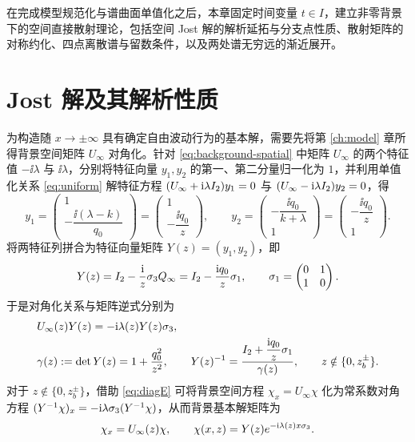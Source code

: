 
在完成模型规范化与谱曲面单值化之后，本章固定时间变量 $t\in I$，建立非零背景下的空间直接散射理论，包括空间 Jost 解的解析延拓与分支点性质、散射矩阵的对称约化、四点离散谱与留数条件，以及两处谱无穷远的渐近展开。

\section{Jost 解及其解析性质}

为构造随 $x\to\pm\infty$ 具有确定自由波动行为的基本解，需要先将第 \ref{ch:model} 章所得背景空间矩阵 $U_\infty$ 对角化。针对 \eqref{eq:background-spatial} 中矩阵 $U_\infty$ 的两个特征值 $-\ii\lambda$ 与 $\ii\lambda$，分别将特征向量 $y_1,y_2$ 的第一、第二分量归一化为 $1$，并利用单值化关系 \eqref{eq:uniform} 解特征方程 $(U_\infty+\mathrm{i}\lambda I_2)y_1=0$ 与 $(U_\infty-\mathrm{i}\lambda I_2)y_2=0$，得
\begin{equation*}
y_1=\begin{pmatrix}1\\[2pt]-\dfrac{\ii(\lambda-k)}{q_0}\end{pmatrix}
=\begin{pmatrix}1\\[2pt]-\dfrac{\ii q_0}{z}\end{pmatrix},\qquad
y_2=\begin{pmatrix}-\dfrac{\ii q_0}{k+\lambda}\\[2pt]1\end{pmatrix}
=\begin{pmatrix}-\dfrac{\ii q_0}{z}\\[2pt]1\end{pmatrix}.
\end{equation*}
将两特征列拼合为特征向量矩阵 $Y(z)=(y_1,y_2)$，即
\begin{equation}\label{eq:E}
Y(z)=I_2-\dfrac{\mathrm{i}}{z}\sigma_3 Q_\infty
=I_2-\dfrac{\mathrm{i} q_0}{z}\sigma_1,\qquad
\sigma_1=\begin{pmatrix}0&1\\1&0\end{pmatrix}.
\end{equation}
于是对角化关系与矩阵逆式分别为
\begin{align}
&U_\infty(z)Y(z)=-\mathrm{i}\lambda(z)Y(z)\sigma_3,\label{eq:diagE}\\
&\gamma(z):=\det Y(z)=1+\dfrac{q_0^2}{z^2},\qquad
Y(z)^{-1}=\dfrac{I_2+\dfrac{\mathrm{i} q_0}{z}\sigma_1}{\gamma(z)},\qquad z\notin\{0,z_b^\pm\}.\label{eq:Y-inverse}
\end{align}
对于 $z\notin\{0,z_b^\pm\}$，借助 \eqref{eq:diagE} 可将背景空间方程 $\chi_x=U_\infty\chi$ 化为常系数对角方程 $(Y^{-1}\chi)_x=-\mathrm{i}\lambda\sigma_3(Y^{-1}\chi)$，从而背景基本解矩阵为
\begin{equation}\label{eq:background-lax}
\chi_x=U_\infty(z)\chi,\qquad
\chi(x,z)=Y(z)e^{-\mathrm{i}\lambda(z)x\sigma_3}.
\end{equation}

